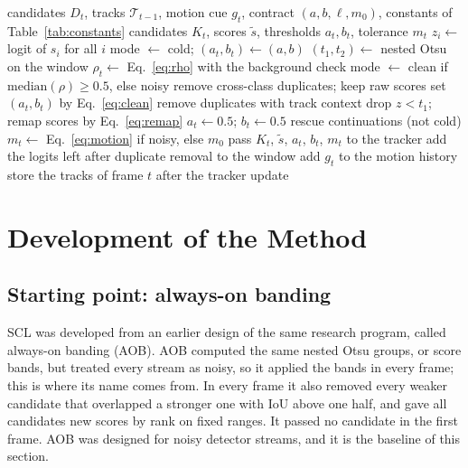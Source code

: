 \documentclass[pdflatex,sn-mathphys-num,iicol]{sn-jnl}
\newcommand{\scl}{SCL}
\newcommand{\aob}{AOB}
\begin{document}
\begin{algorithm}[t]
\caption{\scl{} for frame $t$. The window holds the logits of frames
$t-W$ to $t-1$, so the decision for frame $t$ uses no future frame.}\label{alg:layer}
\begin{algorithmic}[1]
\Require candidates $D_t$, tracks $\mathcal{T}_{t-1}$, motion cue $g_t$, contract $(a,b,\ell,m_0)$, constants of Table~\ref{tab:constants}
\Ensure candidates $K_t$, scores $\tilde{s}$, thresholds $a_t,b_t$, tolerance $m_t$
\State $z_i\gets$ logit of $s_i$ for all $i$ 
 
  \State mode $\gets$ cold; $(a_t,b_t)\gets(a,b)$
\Else
  \State $(t_1,t_2)\gets$ nested Otsu on the window 
  \State $\rho_t\gets$ Eq.~\eqref{eq:rho} with the background check
  \State mode $\gets$ clean if $\mathrm{median}(\rho)\ge0.5$, else noisy
\EndIf
{} 
  \State remove cross-class duplicates; keep raw scores
   set $(a_t,b_t)$ by Eq.~\eqref{eq:clean}
  \EndIf
\Else {}
  \State remove duplicates with track context
  \State drop $z<t_1$; remap scores by Eq.~\eqref{eq:remap}
  \State $a_t\gets0.5$; $b_t\gets0.5$
\EndIf
\State rescue continuations (not cold) 
\State $m_t\gets$ Eq.~\eqref{eq:motion} if noisy, else $m_0$
\State pass $K_t$, $\tilde{s}$, $a_t$, $b_t$, $m_t$ to the tracker
\State add the logits left after duplicate removal to the window
\State add $g_t$ to the motion history
\State store the tracks of frame $t$ after the tracker update
\end{algorithmic}
\end{algorithm}
\section{Development of the Method}\label{sec:development}

\subsection{Starting point: always-on banding}\label{sec:prior}
\scl{} was developed from an earlier design of the same research program,
called always-on banding (\aob{}). \aob{} computed the same nested Otsu
groups, or score bands, but treated every stream as noisy, so it applied the
bands in every frame; this is where its name comes from. In every frame it
also removed every weaker candidate that overlapped a stronger one with
IoU above one half, and gave all candidates new scores by rank on fixed
ranges. It passed no candidate in the first frame. \aob{} was designed for
noisy detector streams, and it is the baseline of this section.
\end{document}
